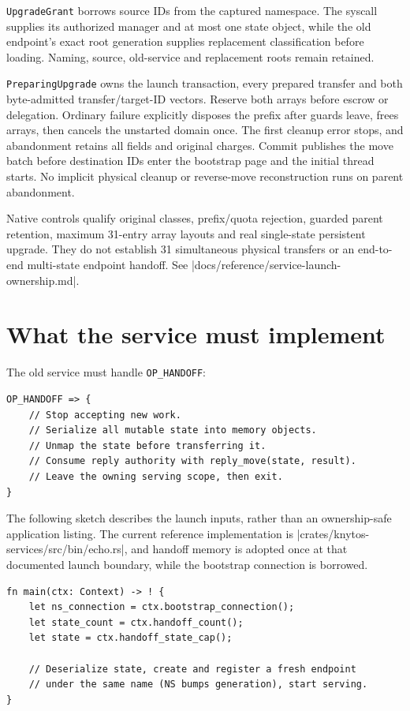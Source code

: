 \texttt{UpgradeGrant} borrows source IDs from the captured namespace. The
syscall supplies its authorized manager and at most one state object, while the old
endpoint's exact root generation supplies replacement classification before
loading. Naming, source, old-service and replacement roots remain retained.

\texttt{PreparingUpgrade} owns the launch transaction, every prepared transfer
and both byte-admitted transfer/target-ID vectors. Reserve both arrays before
escrow or delegation. Ordinary failure explicitly disposes the prefix after
guards leave, frees arrays, then cancels the unstarted domain once. The first
cleanup error stops, and abandonment retains all fields and original charges.
Commit publishes the move batch before destination IDs enter the bootstrap page
and the initial thread starts. No implicit physical cleanup or reverse-move
reconstruction runs on parent abandonment.

Native controls qualify original classes, prefix/quota rejection, guarded
parent retention, maximum 31-entry array layouts and real single-state persistent
upgrade. They do not establish 31 simultaneous physical transfers or an
end-to-end multi-state endpoint handoff. See
\repofile|docs/reference/service-launch-ownership.md|.

\section{What the service must implement}

The old service must handle \texttt{OP\_HANDOFF}:

\begin{lstlisting}[style=rustCode]
OP_HANDOFF => {
    // Stop accepting new work.
    // Serialize all mutable state into memory objects.
    // Unmap the state before transferring it.
    // Consume reply authority with reply_move(state, result).
    // Leave the owning serving scope, then exit.
}
\end{lstlisting}

The following sketch describes the launch inputs, rather than an ownership-safe
application listing. The current reference implementation is
\repofile|crates/knytos-services/src/bin/echo.rs|, and handoff memory is adopted once
at that documented launch boundary, while the bootstrap connection is borrowed.

\begin{lstlisting}[style=rustCode]
fn main(ctx: Context) -> ! {
    let ns_connection = ctx.bootstrap_connection();
    let state_count = ctx.handoff_count();
    let state = ctx.handoff_state_cap();

    // Deserialize state, create and register a fresh endpoint
    // under the same name (NS bumps generation), start serving.
}
\end{lstlisting}

